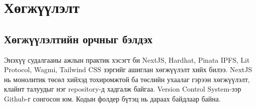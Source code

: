 
\section{Хөгжүүлэлт}
\subsection{Хөгжүүлэлтийн орчныг бэлдэх}
Энэхүү судалгааны ажлын практик хэсэгт би NextJS, Hardhat, Pinata IPFS, Lit Protocol, Wagmi, Tailwind CSS зэргийг ашиглан хөгжүүлэлт хийх билээ. NextJS нь монолитик төсөл хийхэд тохиромжтой ба төслийн ухаалаг гэрээн хөгжүүлэлт, клайнт талуудыг нэг repository-д хадгалж байгаа. Version Control System-ээр Github-г сонгосон юм. Кодын фолдер бүтэц нь дараах байдлаар байна.

\begin{figure}[htbp]
   \centering
   \begin{minipage}[ht]{0.4\textwidth}
       \centering

\end{minipage}
\end{figure}
